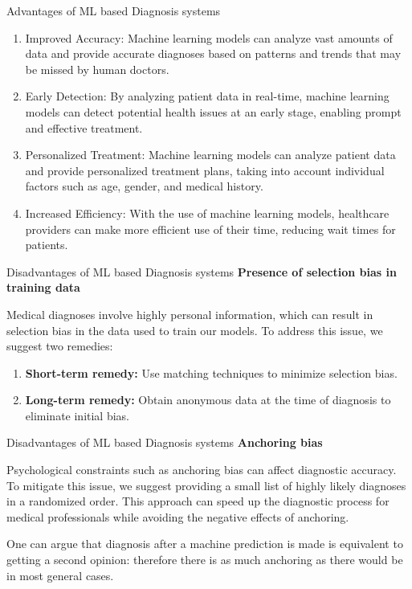 \documentclass{beamer}
\begin{document}

\begin{frame}{Advantages of ML based Diagnosis systems}
    \begin{enumerate}
        \item Improved Accuracy: Machine learning models can analyze vast amounts of data and provide accurate diagnoses based on patterns and trends that may be missed by human doctors.\pause
        \item Early Detection: By analyzing patient data in real-time, machine learning models can detect potential health issues at an early stage, enabling prompt and effective treatment.\pause
        \item Personalized Treatment: Machine learning models can analyze patient data and provide personalized treatment plans, taking into account individual factors such as age, gender, and medical history.\pause
        \item Increased Efficiency: With the use of machine learning models, healthcare providers can make more efficient use of their time, reducing wait times for patients.
        \end{enumerate}
    
\end{frame}
\begin{frame}{Disadvantages of ML based Diagnosis systems}
    \textbf{Presence of selection bias in training data}

Medical diagnoses involve highly personal information, which can result in selection bias in the data used to train our models. To address this issue, we suggest two remedies:

\begin{enumerate}
\item \textbf{Short-term remedy:} Use matching techniques to minimize selection bias.\pause
\item \textbf{Long-term remedy:} Obtain anonymous data at the time of diagnosis to eliminate initial bias.
\end{enumerate}
\end{frame}
\begin{frame}{Disadvantages of ML based Diagnosis systems}
    \textbf{Anchoring bias}

Psychological constraints such as anchoring bias can affect diagnostic accuracy. To mitigate this issue, we suggest providing a small list of highly likely diagnoses in a randomized order. This approach can speed up the diagnostic process for medical professionals while avoiding the negative effects of anchoring.\pause

One can argue that diagnosis after a machine prediction is made is equivalent to getting a second opinion: therefore there is as much anchoring as there would be in most general cases.
\end{frame}
\end{document}
